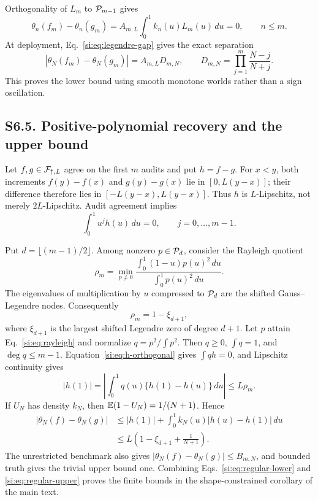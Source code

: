 Orthogonality of $L_m$ to $\mathcal P_{m-1}$ gives
\begin{equation}
\theta_n(f_m)-\theta_n(g_m)
=A_{m,L}\int_0^1k_n(u)L_m(u)\,du=0,
\qquad n\le m.
\label{si:eq:regular-audit-agreement}
\end{equation}
At deployment, Eq.~\ref{si:eq:legendre-gap} gives the exact separation
\begin{equation}
|\theta_N(f_m)-\theta_N(g_m)|
=A_{m,L}D_{m,N},\qquad
D_{m,N}=\prod_{j=1}^m\frac{N-j}{N+j}.
\label{si:eq:regular-lower}
\end{equation}
This proves the lower bound using smooth monotone worlds rather than a sign oscillation.

\subsection*{S6.5. Positive-polynomial recovery and the upper bound}

Let $f,g\in\mathcal F_{\uparrow,L}$ agree on the first $m$ audits and put $h=f-g$. For $x<y$, both increments $f(y)-f(x)$ and $g(y)-g(x)$ lie in $[0,L(y-x)]$; their difference therefore lies in $[-L(y-x),L(y-x)]$. Thus $h$ is $L$-Lipschitz, not merely $2L$-Lipschitz. Audit agreement implies
\begin{equation}
\int_0^1u^jh(u)\,du=0,\qquad j=0,\ldots,m-1.
\label{si:eq:h-orthogonal}
\end{equation}

Put $d=\lfloor(m-1)/2\rfloor$. Among nonzero $p\in\mathcal P_d$, consider the Rayleigh quotient
\begin{equation}
\rho_m=\min_{p\ne0}
\frac{\int_0^1(1-u)p(u)^2\,du}{\int_0^1p(u)^2\,du}.
\label{si:eq:rayleigh}
\end{equation}
The eigenvalues of multiplication by $u$ compressed to $\mathcal P_d$ are the shifted Gauss--Legendre nodes. Consequently
\begin{equation}
\rho_m=1-\xi_{d+1},
\label{si:eq:gauss-radius}
\end{equation}
where $\xi_{d+1}$ is the largest shifted Legendre zero of degree $d+1$. Let $p$ attain Eq.~\ref{si:eq:rayleigh} and normalize $q=p^2/\int p^2$. Then $q\ge0$, $\int q=1$, and $\deg q\le m-1$. Equation~\ref{si:eq:h-orthogonal} gives $\int qh=0$, and Lipschitz continuity gives
\begin{equation}
|h(1)|
=\left|\int_0^1q(u)\{h(1)-h(u)\}\,du\right|
\le L\rho_m.
\label{si:eq:endpoint-recovery}
\end{equation}
If $U_N$ has density $k_N$, then $\mathbb{E}(1-U_N)=1/(N+1)$. Hence
\begin{align}
|\theta_N(f)-\theta_N(g)|
&\le |h(1)|+\int_0^1k_N(u)|h(u)-h(1)|\,du\nonumber\\
&\le L\left(1-\xi_{d+1}+\frac1{N+1}\right).
\label{si:eq:regular-upper}
\end{align}
The unrestricted benchmark also gives $|\theta_N(f)-\theta_N(g)|\le B_{m,N}$, and bounded truth gives the trivial upper bound one. Combining Eqs.~\ref{si:eq:regular-lower} and \ref{si:eq:regular-upper} proves the finite bounds in the shape-constrained corollary of the main text.

